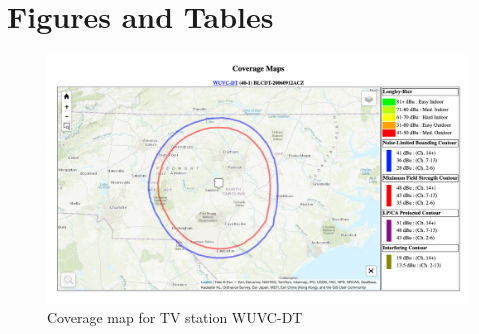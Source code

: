 \documentclass[11pt]{article}
\begin{document}
\clearpage
\pagebreak

\begin{singlespace}
\begin{scriptsize}

%
{}
\end{scriptsize}
\end{singlespace}

\pagebreak
\clearpage

\section*{Figures and Tables}




%
%



\begin{figure}[!hbtp]
\centering
\caption{Coverage map for TV station WUVC-DT}\label{f:contour_example}
\includegraphics[width=14.4cm]{../../analysis/Output/img/ContourExample.png}
\end{figure} 
\end{document}
